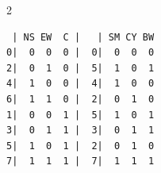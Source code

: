 
  \begin{footnotesize}
  
\begin{multicols}{2}
\begin{verbatim}
 | NS EW  C |   | SM CY BW
0|  0  0  0 |  0|  0  0  0
2|  0  1  0 |  5|  1  0  1
4|  1  0  0 |  4|  1  0  0
6|  1  1  0 |  2|  0  1  0
1|  0  0  1 |  5|  1  0  1
3|  0  1  1 |  3|  0  1  1
5|  1  0  1 |  2|  0  1  0
7|  1  1  1 |  7|  1  1  1
\end{verbatim}

\begin{flushleft}
\verb%static int gapp_alu[] = {%
\\* \verb%    0,  /*%\mbox{ 0 }\verb%*/%
\\* \verb%    5,  /*%\mbox{ 1 }\verb%*/%
\\* \verb%    5,  /*%\mbox{ 2 }\verb%*/%
\\* \verb%    3,  /*%\mbox{ 3 }\verb%*/%
\\* \verb%    4,  /*%\mbox{ 4 }\verb%*/%
\\* \verb%    2,  /*%\mbox{ 5 }\verb%*/%
\\* \verb%    2,  /*%\mbox{ 6 }\verb%*/%
\\* \verb%    7   /*%\mbox{ 7 }\verb%*/ };%
\end{flushleft}
\end{multicols}

  \end{footnotesize}
  
